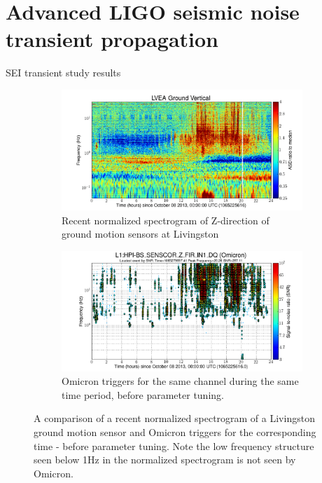 \section{Advanced LIGO seismic noise transient propagation}

SEI transient study results 

\begin{figure}[htb]
\centering
\begin{subfigure}{.45\textwidth}
  \centering
  \includegraphics[width=\linewidth]{figures/Spectro_ground.png}
  \caption{Recent normalized spectrogram of Z-direction of ground motion sensors at Livingston}
  \label{fig:groundZspec}
\end{subfigure}%
\begin{subfigure}{.45\textwidth}
  \centering
  \includegraphics[width=\linewidth]{figures/Omicron_ground.png}
  \caption{Omicron triggers for the same channel during the same time period, before parameter tuning.}
  \label{fig:groundOmicron}
\end{subfigure}
\caption{A comparison of a recent normalized spectrogram of a Livingston ground motion sensor and Omicron triggers for the corresponding time - before parameter tuning. Note the low frequency structure seen below 1Hz in the normalized spectrogram is not seen by Omicron.}
\label{fig:OmicronTuning}
\end{figure}

